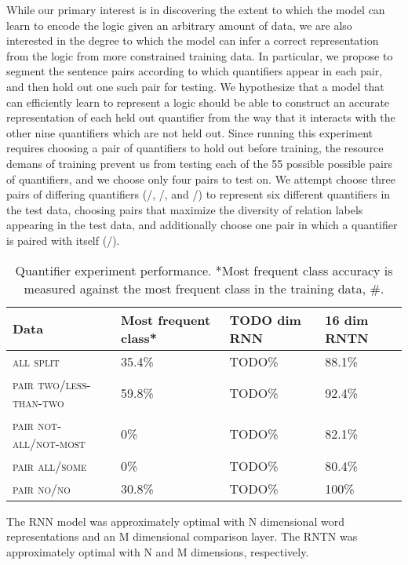 While our primary interest is in discovering the extent to which the model can learn to encode the logic given an arbitrary amount of data, we are also interested in the degree to which the model can infer a correct representation from the logic from more constrained training data. In particular, we propose to segment the sentence pairs according to which quantifiers appear in each pair, and then hold out one such pair for testing. We hypothesize that a model that can efficiently learn to represent a logic should be able to construct an accurate representation of each held out quantifier from the way that it interacts with the other nine quantifiers which are not held out. Since running this experiment requires choosing a pair of quantifiers to hold out before training, the resource demans of training prevent us from testing each of the 55 possible possible pairs of quantifiers, and we choose only four pairs to test on. We attempt choose three pairs of differing quantifiers (/, /, and /) to represent six different quantifiers in the test data, choosing pairs that maximize the diversity of relation labels appearing in the test data, and additionally choose one pair in which a quantifier is paired with itself (/).

\begin{table}\small\centering
\begin{tabular}{|l|lll|}\hline
\textbf{Data} & \textbf{Most frequent class*} & \textbf{TODO dim RNN} & \textbf{16 dim RNTN}\\\hline
\textsc{all split}	& 35.4\% &	TODO\%&	88.1\% \\\hline
\textsc{pair two/less-than-two}	& 59.8\% &	TODO\% &	92.4\% \\
\textsc{pair not-all/not-most}	&0\% &	   TODO\%  &	82.1\% \\
\textsc{pair all/some}	& 0\%& TODO\%  &	80.4\% \\
\textsc{pair no/no}	& 30.8\% &	TODO\% &	100\% \\
\hline
\end{tabular}

\caption{Quantifier experiment performance. *Most frequent class accuracy is measured against the most frequent class in the training data, \#.\label{resultstable}}
\end{table} 



The RNN model was approximately optimal with N dimensional word representations and an M dimensional comparison layer. The RNTN was approximately optimal with N and M dimensions, respectively.

